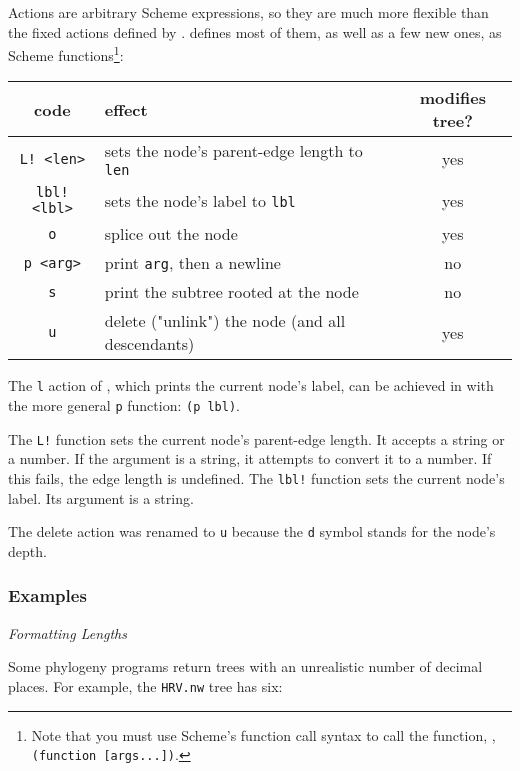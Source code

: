 Actions are arbitrary Scheme expressions, so they are much more flexible than
the fixed actions defined by \ed. \sched{} defines most of them, as well as a
few new ones, as Scheme functions\footnote{Note that you must use Scheme's function call syntax to call the function, \ie, \texttt{(function [args...])}.}:

\begin{center}
\begin{tabular}{clc}
code & effect & modifies tree?\\
\hline
\texttt{L! <len>}	& sets the node's parent-edge length to \texttt{len}	& yes \\
\texttt{lbl! <lbl>}	& sets the node's label to \texttt{lbl}	& yes \\
\texttt{o} 				& splice out the node 									& yes \\
\texttt{p <arg>} 	& print \texttt{arg}, then a newline 		& no \\
\texttt{s} 				& print the subtree rooted at the node 	& no \\
\texttt{u} 				& delete ("unlink") the node (and all descendants) & yes \\
\end{tabular}
\end{center}

\noindent{}The \texttt{l} action of \ed{}, which prints the current node's
label, can be achieved in \sched{} with the more general \texttt{p} function:
\texttt{(p lbl)}.

The \texttt{L!} function sets the current node's parent-edge length. It accepts
a string or a number. If the argument is a string, it attempts to convert it to
a number. If this fails, the edge length is undefined. The \texttt{lbl!}
function sets the current node's label. Its argument is a string.

The delete action was renamed to \texttt{u} because the \texttt{d} symbol stands
for the node's depth.

\subsubsection{Examples}

{\it Formatting Lengths} 

\noindent{}Some phylogeny programs return \nw{} trees with an unrealistic number
of decimal places. For example, the \texttt{HRV.nw} tree has six:


\begin{samepage}

\end{samepage}

